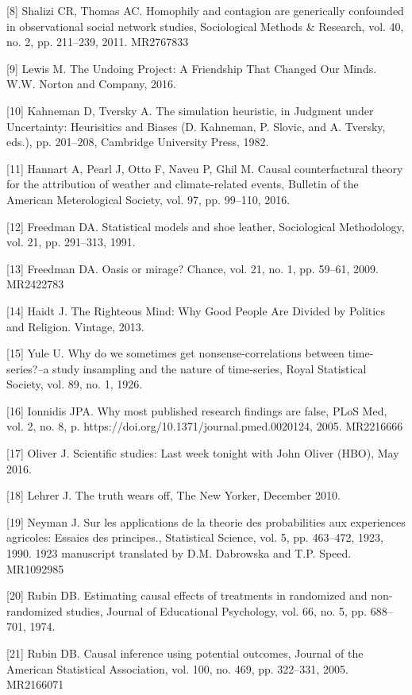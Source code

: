     [8] Shalizi CR, Thomas AC. Homophily and contagion are generically confounded in observational social network studies, Sociological Methods \& Research, vol. 40, no. 2, pp. 211–239, 2011. MR2767833

    [9] Lewis M. The Undoing Project: A Friendship That Changed Our Minds. W.W. Norton and Company, 2016.
    
    [10] Kahneman D, Tversky A. The simulation heuristic, in Judgment under Uncertainty: Heurisitics and Biases (D. Kahneman, P. Slovic, and A. Tversky, eds.), pp. 201–208, Cambridge University Press, 1982.
    
    [11] Hannart A, Pearl J, Otto F, Naveu P, Ghil M. Causal counterfactural theory for the attribution of weather and climate-related events, Bulletin of the American Meterological Society, vol. 97, pp. 99–110, 2016.
    
    [12] Freedman DA. Statistical models and shoe leather, Sociological Methodology, vol. 21, pp. 291–313, 1991.
    
    [13] Freedman DA. Oasis or mirage? Chance, vol. 21, no. 1, pp. 59–61, 2009. MR2422783
    
    [14] Haidt J. The Righteous Mind: Why Good People Are Divided by Politics and Religion. Vintage, 2013.
    
    [15] Yule U. Why do we sometimes get nonsense-correlations between time-series?–a study insampling and the nature of time-series, Royal Statistical Society, vol. 89, no. 1, 1926.
    
    [16] Ionnidis JPA. Why most published research findings are false, PLoS Med, vol. 2, no. 8, p. https://doi.org/10.1371/journal.pmed.0020124, 2005. MR2216666

    [17] Oliver J. Scientific studies: Last week tonight with John Oliver (HBO), May 2016.
    
    [18] Lehrer J. The truth wears off, The New Yorker, December 2010.
    
    [19] Neyman J. Sur les applications de la theorie des probabilities aux experiences agricoles: Essaies des principes., Statistical Science, vol. 5, pp. 463–472, 1923, 1990. 1923 manuscript translated by D.M. Dabrowska and T.P. Speed. MR1092985
    
    [20] Rubin DB. Estimating causal effects of treatments in randomized and non-randomized studies, Journal of Educational Psychology, vol. 66, no. 5, pp. 688–701, 1974.
    
    [21] Rubin DB. Causal inference using potential outcomes, Journal of the American Statistical Association, vol. 100, no. 469, pp. 322–331, 2005. MR2166071
    
